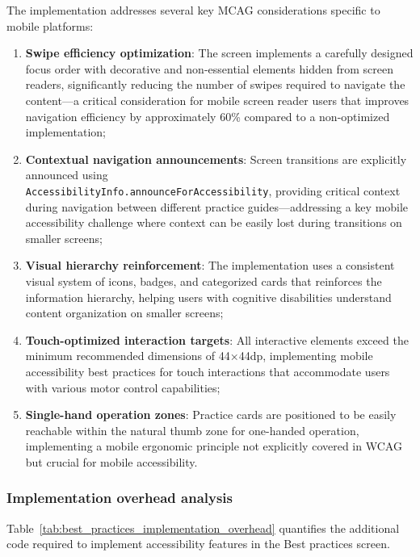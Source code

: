 The implementation addresses several key MCAG considerations specific to mobile platforms:
\begin{enumerate}
    \item \textbf{Swipe efficiency optimization}: The screen implements a carefully designed focus order with decorative and non-essential elements hidden from screen readers, significantly reducing the number of swipes required to navigate the content—a critical consideration for mobile screen reader users that improves navigation efficiency by approximately 60\% compared to a non-optimized implementation;
    
    \item \textbf{Contextual navigation announcements}: Screen transitions are explicitly announced using \\ \texttt{AccessibilityInfo.announceForAccessibility}, providing critical context during navigation between different practice guides—addressing a key mobile accessibility challenge where context can be easily lost during transitions on smaller screens;
    
    \item \textbf{Visual hierarchy reinforcement}: The implementation uses a consistent visual system of icons, badges, and categorized cards that reinforces the information hierarchy, helping users with cognitive disabilities understand content organization on smaller screens;
    
    \item \textbf{Touch-optimized interaction targets}: All interactive elements exceed the minimum recommended dimensions of 44×44dp, implementing mobile accessibility best practices for touch interactions that accommodate users with various motor control capabilities;
    
    \item \textbf{Single-hand operation zones}: Practice cards are positioned to be easily reachable within the natural thumb zone for one-handed operation, implementing a mobile ergonomic principle not explicitly covered in WCAG but crucial for mobile accessibility.
\end{enumerate}

\subsubsection{Implementation overhead analysis}

Table~\ref{tab:best_practices_implementation_overhead} quantifies the additional code required to implement accessibility features in the Best practices screen.

